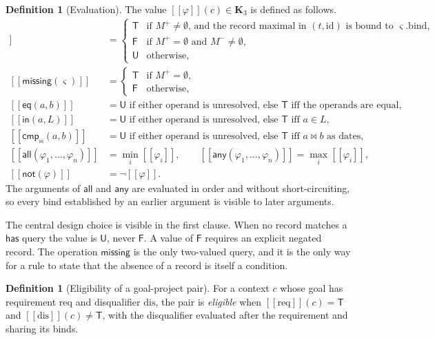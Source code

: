 \documentclass[11pt]{article}
\theoremstyle{definition}
\newtheorem{definition}[theorem]{Definition}
\theoremstyle{remark}
\newcommand{\Kt}{\mathbf{K}_3}
\newcommand{\vT}{\mathsf{T}}
\newcommand{\vU}{\mathsf{U}}
\newcommand{\vF}{\mathsf{F}}
\newcommand{\sem}[1]{[\![#1]\!]}
\begin{document}
\begin{definition}[Evaluation]\label{def:eval}
The value $\sem{\varphi}(c)\in\Kt$ is defined as follows.
\begin{align*}
\sem{\mathsf{has}(\varsigma)}&=\begin{cases}\vT&\text{if }M^{+}\neq\emptyset\text{, and the record maximal in }(t,\mathrm{id})\text{ is bound to }\varsigma.\mathrm{bind},\\ \vF&\text{if }M^{+}=\emptyset\text{ and }M^{-}\neq\emptyset,\\ \vU&\text{otherwise,}\end{cases}\\
\sem{\mathsf{missing}(\varsigma)}&=\begin{cases}\vT&\text{if }M^{+}=\emptyset,\\ \vF&\text{otherwise,}\end{cases}\\
\sem{\mathsf{eq}(a,b)}&=\vU\text{ if either operand is unresolved, else }\vT\text{ iff the operands are equal,}\\
\sem{\mathsf{in}(a,L)}&=\vU\text{ if either operand is unresolved, else }\vT\text{ iff }a\in L,\\
\sem{\mathsf{cmp}_{\bowtie}(a,b)}&=\vU\text{ if either operand is unresolved, else }\vT\text{ iff }a\bowtie b\text{ as dates,}\\
\sem{\mathsf{all}(\varphi_1,\dots,\varphi_n)}&=\min_i\sem{\varphi_i},\qquad\sem{\mathsf{any}(\varphi_1,\dots,\varphi_n)}=\max_i\sem{\varphi_i},\\
\sem{\mathsf{not}(\varphi)}&=\neg\sem{\varphi}.
\end{align*}
The arguments of $\mathsf{all}$ and $\mathsf{any}$ are evaluated in order and without short-circuiting, so every bind established by an earlier argument is visible to later arguments.
\end{definition}

The central design choice is visible in the first clause. When no record matches a $\mathsf{has}$ query the value is $\vU$, never $\vF$. A value of $\vF$ requires an explicit negated record. The operation $\mathsf{missing}$ is the only two-valued query, and it is the only way for a rule to state that the absence of a record is itself a condition.

\begin{definition}[Eligibility of a goal-project pair]\label{def:elig}
For a context $c$ whose goal has requirement $\mathrm{req}$ and disqualifier $\mathrm{dis}$, the pair is \emph{eligible} when $\sem{\mathrm{req}}(c)=\vT$ and $\sem{\mathrm{dis}}(c)\neq\vT$, with the disqualifier evaluated after the requirement and sharing its binds.
\end{definition}
\end{document}
